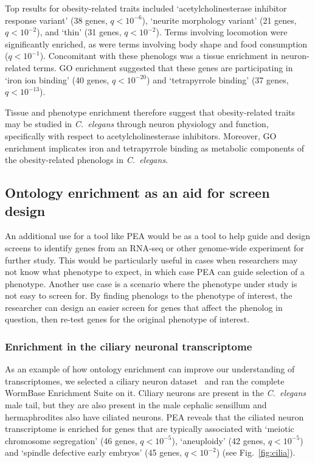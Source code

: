 \documentclass[10pt, onecolumn]{article}
\newcommand{\cel}{\emph{C.~elegans}}
\newcommand{\qval}[1]{\ensuremath{q<10^{-#1}}}
\begin{document}
Top results for obesity-related traits included `acetylcholinesterase inhibitor
response variant' (38 genes, \qval{6}), `neurite morphology variant' (21 genes,
\qval{2}), and `thin' (31 genes, \qval{2}). Terms involving locomotion were
significantly enriched, as were terms involving body shape and food consumption
(\qval{1}). Concomitant with these phenologs was a tissue enrichment in
neuron-related terms. GO enrichment suggested that these genes are participating
in `iron ion binding' (40 genes, \qval{20}) and `tetrapyrrole binding' (37
genes, \qval{13}).

Tissue and phenotype enrichment therefore suggest that obesity-related traits
may be studied in \cel{} through neuron physiology and function, specifically
with respect to acetylcholinesterase inhibitors. Moreover, GO enrichment
implicates iron and tetrapyrrole binding as metabolic components of the
obesity-related phenologs in \cel{}.

\subsection*{Ontology enrichment as an aid for screen design}
An additional use for a tool like PEA would be as a tool to help guide and
design screens to identify genes from an RNA-seq or other genome-wide experiment
for further study. This would be particularly useful in cases when researchers
may not know what phenotype to expect, in which case PEA can guide selection of
a phenotype. Another use case is a scenario where the phenotype under study is
not easy to screen for. By finding phenologs to the phenotype of interest, the
researcher can design an easier screen for genes that affect the phenolog in
question, then re-test genes for the original phenotype of interest.

\subsubsection*{Enrichment in the ciliary neuronal transcriptome}
As an example of how ontology enrichment can improve our understanding of
transcriptomes, we selected a ciliary neuron dataset~\cite{Wang2015} and ran the
complete WormBase Enrichment Suite on it. Ciliary neurons are present in the
\cel{} male tail, but they are also present in the male cephalic sensillum and
hermaphrodites also have ciliated neurons. PEA reveals that the ciliated neuron
transcriptome is enriched for genes that are typically associated with `meiotic
chromosome segregation' (46 genes, \qval{5}), `aneuploidy' (42 genes, \qval{5})
and `spindle defective early embryos' (45 genes, \qval{2}) (see
Fig.~\ref{fig:cilia}).
\end{document}

